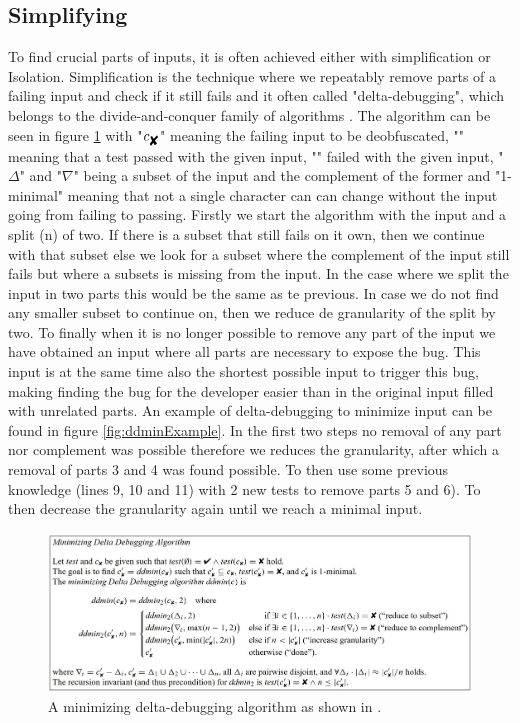 \subsection{Simplifying}
\label{inputReduction:Simplifying}
To find crucial parts of inputs, it is often achieved either with simplification or Isolation. 
Simplification is the technique where we repeatably remove parts of a failing input and check if it still fails and it often called "delta-debugging", which belongs to the divide-and-conquer family of algorithms \cite{2FuzzingAndDeltaDebuggingSMTSolvers}. 
The algorithm can be seen in figure \ref{fig:ddmin} with 
"$ c_{\mbox{\ding{56}}} $"  %
meaning the failing input to be deobfuscated,
"" %
meaning that a test passed with the given input,
"" %
failed with the given input, 
"$\Delta$" and "$\nabla$" being a subset of the input and the complement of the former and
"1-minimal" meaning that not a single character can can change without the input going from failing to passing. Firstly we start the algorithm with the input and a split (n) of two. If there is a subset that still fails on it own, then we continue with that subset else we look for a subset where the complement of the input still fails but where a subsets is missing from the input. In the case where we split the input in two parts this would be the same as te previous. In case we do not find any smaller subset to continue on, then we reduce de granularity of the split by two. To finally when it is no longer possible to remove any part of the input we have obtained an input where all parts are necessary to expose the bug. This input is at the same time also the shortest possible input to trigger this bug, making finding the bug for the developer easier than in the original input filled with unrelated parts. 
An example of delta-debugging to minimize input can be found in figure \ref{fig:ddminExample}. In the first two steps no removal of any part nor complement was possible therefore we reduces the granularity, after which a removal of parts 3 and 4 was found possible. To then use some previous knowledge (lines 9, 10 and 11) with 2 new tests to remove parts 5 and 6). To then decrease the granularity again until we reach a minimal input.

\begin{figure}
	\centering
	\includegraphics[width=1.0\textwidth]{images/ddminFromPaper5edit}
	\caption{A minimizing delta-debugging algorithm as shown in \cite{5zeller2002simplifyingIsolatingFailure-inducing}.}
	\label{fig:ddmin}
\end{figure}

